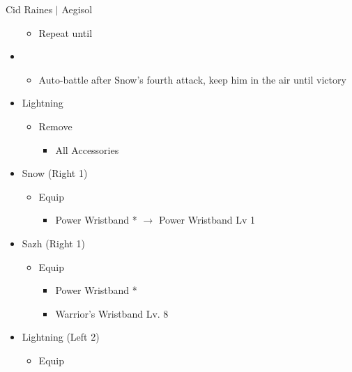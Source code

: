 \begin{battle}{Cid Raines $|$ Aegisol}
\begin{multicols}{2}
\begin{itemize}
    \begin{itemize}
        \item Repeat until \stagger
    \end{itemize}
    \item \sixth
    \begin{itemize}
        \item Auto-battle after Snow's fourth attack, keep him in the air until victory
    \end{itemize}
\end{itemize}
\end{multicols}
\end{battle}

\begin{menu}
\begin{itemize}
    \equip
    \begin{itemize}
        \item Lightning
        \begin{itemize}
            \item Remove
            \begin{itemize}
                \item All Accessories
            \end{itemize}
        \end{itemize}
        \item Snow (Right 1)
        \begin{itemize}
            \item Equip
            \begin{itemize}
                \item Power Wristband * $\rightarrow$ Power Wristband Lv 1
            \end{itemize}
        \end{itemize}
        \item Sazh (Right 1)
        \begin{itemize}
            \item Equip
            \begin{itemize}
                \item Power Wristband *
                \item Warrior's Wristband Lv. 8
            \end{itemize}
        \end{itemize}
        \item Lightning (Left 2)
        \begin{itemize}
            \item Equip

\end{itemize}
\end{itemize}
\end{itemize}
\end{menu}
